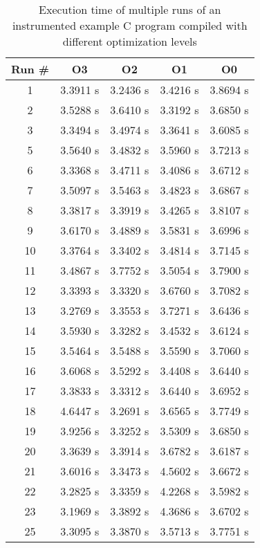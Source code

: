 \begin{table}
  \caption{Execution time of multiple runs of an instrumented example C program compiled with different optimization levels}
  \label{table:instrumented_optimizations_benchmark}
  \centering
  \begin{tabular}{cllll}
    Run \# & \multicolumn{1}{c}{O3} & \multicolumn{1}{c}{O2} & \multicolumn{1}{c}{O1} & \multicolumn{1}{c}{O0} \\ \hline
    1 & 3.3911 s & 3.2436 s  & 3.4216 s  & 3.8694 s  \\
    2 & 3.5288 s & 3.6410 s & 3.3192 s  & 3.6850 s  \\
    3 & 3.3494 s & 3.4974 s & 3.3641 s & 3.6085 s \\
    5 & 3.5640 s & 3.4832 s & 3.5960 s & 3.7213 s \\
    6 & 3.3368 s & 3.4711 s & 3.4086 s & 3.6712 s \\
    7 & 3.5097 s & 3.5463 s & 3.4823 s & 3.6867 s \\
    8 & 3.3817 s & 3.3919 s & 3.4265 s & 3.8107 s \\
    9 & 3.6170 s & 3.4889 s & 3.5831 s & 3.6996 s \\
    10 &3.3764 s  & 3.3402 s  & 3.4814 s & 3.7145 s \\
    11 &3.4867 s & 3.7752 s & 3.5054 s & 3.7900 s \\
    12 &3.3393 s & 3.3320 s & 3.6760 s & 3.7082 s \\
    13 &3.2769 s & 3.3553 s   & 3.7271 s & 3.6436 s  \\
    14 &3.5930 s & 3.3282 s & 3.4532 s & 3.6124 s \\
    15 &3.5464 s & 3.5488 s & 3.5590 s  & 3.7060 s \\
    16 &3.6068 s & 3.5292 s  & 3.4408 s & 3.6440 s \\
    17 &3.3833 s & 3.3312 s & 3.6440 s   & 3.6952 s \\
    18 &4.6447 s  & 3.2691 s & 3.6565 s & 3.7749 s \\
    19 &3.9256 s & 3.3252 s & 3.5309 s  & 3.6850 s \\
    20 &3.3639 s & 3.3914 s & 3.6782 s & 3.6187 s \\
    21 &3.6016 s & 3.3473 s & 4.5602 s & 3.6672 s \\
    22 &3.2825 s & 3.3359 s & 4.2268 s & 3.5982 s  \\
    23 &3.1969 s & 3.3892 s & 4.3686 s & 3.6702 s \\
    25 &3.3095 s & 3.3870 s & 3.5713 s & 3.7751 s \\

\end{tabular}
\end{table}
